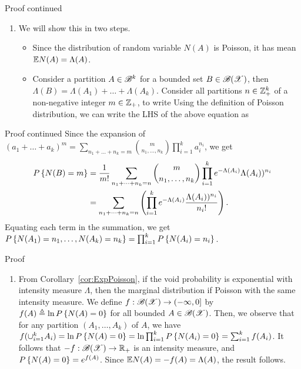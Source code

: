 \documentclass[12pt,aspectratio=169]{beamer}
\begin{document}
\begin{frame}
\begin{block}{Proof continued}
\begin{enumerate}
\item[$iii \implies iv\_$] We will show this in two steps. 
\begin{itemize}
\item[Mean:] Since the distribution of random variable $N(A)$ is Poisson, it has mean $\mathbb{E} N(A) = \Lambda(A)$. 
\item[CIP: ] <2-> Consider a partition $A \in \mathscr{B}^k$ for a bounded set $B\in\mathscr{B}(\mathscr{X})$, then 
$\Lambda(B) = \Lambda(A_1) + \dots + \Lambda(A_k)$. 
Consider all partitions $n\in\mathbb{Z}_+^k$ of a non-negative integer $m \in \mathbb{Z}_+$, to write 
Using the definition of Poisson distribution, we can write the LHS of the above equation as 
\end{itemize}
\end{enumerate}
\end{block}
\end{frame}


\begin{frame}
\begin{block}{Proof continued}
Since the expansion of $(a_1 + \dots + a_k)^m = \sum_{n_1 + \dots+n_k = m}\binom{m}{n_1, \dots, n_k}\prod_{i=1}^ka_i^{n_i}$, 
we get 
\begin{align*}
P\left\{N(B) = m\right\} 
&= \frac{1}{m!}\sum_{n_1 + \dots + n_ k =n}\binom{m}{n_1, \dots, n_k}\prod_{i=1}^ke^{-\Lambda(A_i)} \Lambda(A_i))^{n_i} \\
&= \sum_{n_1+\dots+n_k = n}\left(\prod_{i=1}^ke^{-\Lambda(A_i)} \frac{\Lambda(A_i))^{n_i}}{n_i!}\right). 
\end{align*}
Equating each term in the summation, we get $P\left\{N(A_1) = n_1, \dots, N(A_k) = n_k\right\} = \prod_{i=1}^kP\left\{N(A_i) = n_i\right\}$. 
\end{block}
\end{frame}


\begin{frame}
\begin{block}{Proof}
\begin{enumerate}
\item[$iv \implies i\_$] 
From Corollary~\ref{cor:ExpPoisson}, if the void probability is exponential with intensity measure $\Lambda$, then the marginal distribution if Poisson with the same intensity measure. 
We define $f:\mathscr{B}(\mathscr{X})\to(-\infty, 0]$ by $f(A) \triangleq \ln P\left\{N(A) = 0\right\}$ for all bounded $A \in \mathscr{B}(\mathscr{X})$. 
Then, we observe that for any partition $(A_1,\dots, A_k)$ of $A$, we have $f(\cup_{i=1}^kA_i) = \ln P\left\{N(A)= 0\right\} = \ln\prod_{i=1}^kP\left\{N(A_i) = 0\right\} = \sum_{i=1}^kf(A_i)$.
It follows that $-f:\mathscr{B}(\mathscr{X})\to\mathbb{R}_+$ is an intensity measure, and $P\left\{N(A)=0\right\} = e^{f(A)}$. 
Since $\mathbb{E} N(A) = -f(A) = \Lambda(A)$, the result follows. 
\end{enumerate}
\end{block}
\end{frame}
\end{document}
